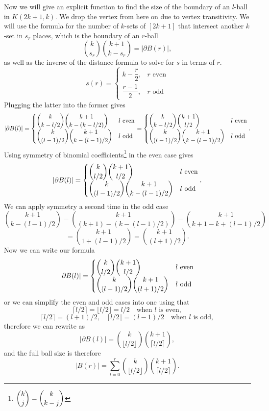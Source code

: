 \documentclass{article}
\begin{document}
Now we will give an explicit function to find the size of the boundary of an $l$-ball in $K(2k+1,k)$. We drop the vertex from here on due to vertex transitivity. We will use the formula for the number of $k$-sets of $[2k+1]$ that intersect another $k$-set in $s_r$ places, which is the boundary of an $r$-ball
\[
\binom{k}{s_r} \binom{k+1}{k-s_r} = |\partial B(r)|,
\]
as well as the inverse of the distance formula to solve for $s$ in terms of $r$.
\[
s(r) =
\begin{cases}
    k - \dfrac{r}{2}, & r \text{ even} \\[6pt]
    \dfrac{r-1}{2}, & r \text{ odd}
\end{cases}
\]
Plugging the latter into the former gives
\[
|\partial B(l)| =
\begin{cases}
    \dbinom{k}{k - l/2} \dbinom{k+1}{k - (k - l/2)} & l \text{ even} \\[6pt]
    \dbinom{k}{(l-1)/2} \dbinom{k+1}{k - (l-1)/2} & l \text{ odd}
\end{cases}
=
\begin{cases}
    \dbinom{k}{k - l/2} \dbinom{k+1}{l/2} & l \text{ even} \\[6pt]
    \dbinom{k}{(l-1)/2} \dbinom{k+1}{k - (l-1)/2} & l \text{ odd}
\end{cases}.
\]
Using symmetry of binomial coefficients\footnote{$\dbinom{k}{j} = \dbinom{k}{k-j}$} in the even case gives
\[
|\partial B(l)| =
\begin{cases}
    \dbinom{k}{l/2} \dbinom{k+1}{l/2} & l \text{ even} \\[6pt]
    \dbinom{k}{(l-1)/2} \dbinom{k+1}{k - (l-1)/2} & l \text{ odd}
\end{cases}.
\]
We can apply symmetry a second time in the odd case
\[
\binom{k+1}{k - (l-1)/2} =
\binom{k+1}{(k+1) - ( k - (l-1)/2)} =
\binom{k+1}{k+1 - k + (l-1)/2}
\]
\[
= \binom{k+1}{1 + (l-1)/2} = \binom{k+1}{(l+1)/2}.
\]
Now we can write our formula
\[
|\partial B(l)| =
\begin{cases}
    \dbinom{k}{l/2} \dbinom{k+1}{l/2} & l \text{ even} \\[6pt]
    \dbinom{k}{(l-1)/2} \dbinom{k+1}{(l+1)/2} & l \text{ odd}
\end{cases}
\]
or we can simplify the even and odd cases into one using that
\[
\lceil l/2 \rceil = \lfloor l/2 \rfloor = l/2 \quad \text{when $l$ is even},
\]
\[
\lceil l/2 \rceil = (l+1)/2, \quad \lfloor l/2 \rfloor = (l-1)/2 \quad \text{when $l$ is odd},
\]
therefore we can rewrite as
\[
|\partial B(l)| = \binom{k}{\lfloor l/2 \rfloor} \binom{k+1}{\lceil l/2 \rceil},
\]
and the full ball size is therefore
\[
|B(r)| = \sum_{l=0}^{r} \binom{k}{\lfloor l/2 \rfloor} \binom{k+1}{\lceil l/2 \rceil}.
\]
\end{document}
